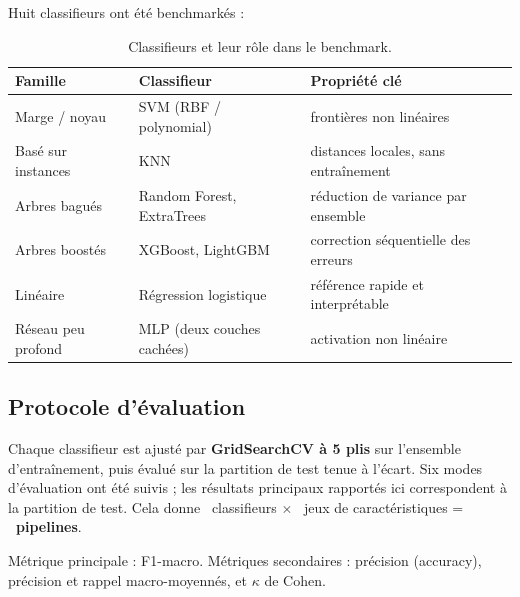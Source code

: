 Huit classifieurs ont été benchmarkés :

\begin{table}[H]
  \centering
  \caption{Classifieurs et leur rôle dans le benchmark.}
  \label{tab:classifiers}
  \begin{tabular}{@{}lll@{}}
    \toprule
    \textbf{Famille} & \textbf{Classifieur} & \textbf{Propriété clé} \\
    \midrule
    Marge / noyau & SVM (RBF / polynomial) & frontières non linéaires \\
    Basé sur instances & KNN & distances locales, sans entraînement \\
    Arbres bagués & Random Forest, ExtraTrees & réduction de variance par ensemble \\
    Arbres boostés & XGBoost, LightGBM & correction séquentielle des erreurs \\
    Linéaire & Régression logistique & référence rapide et interprétable \\
    Réseau peu profond & MLP (deux couches cachées) & activation non linéaire \\
    \bottomrule
  \end{tabular}
\end{table}

\subsection{Protocole d'évaluation}

Chaque classifieur est ajusté par \textbf{GridSearchCV à 5 plis} sur l'ensemble
d'entraînement, puis évalué sur la partition de test tenue à l'écart. Six modes
d'évaluation ont été suivis ; les résultats principaux rapportés ici correspondent
à la partition de test. Cela donne
\NModels{}~classifieurs $\times$ \NFeatureSets{}~jeux de caractéristiques = \textbf{\NRuns{}~pipelines}.

Métrique principale : F1-macro. Métriques secondaires : précision (accuracy),
précision et rappel macro-moyennés, et $\kappa$ de Cohen.
